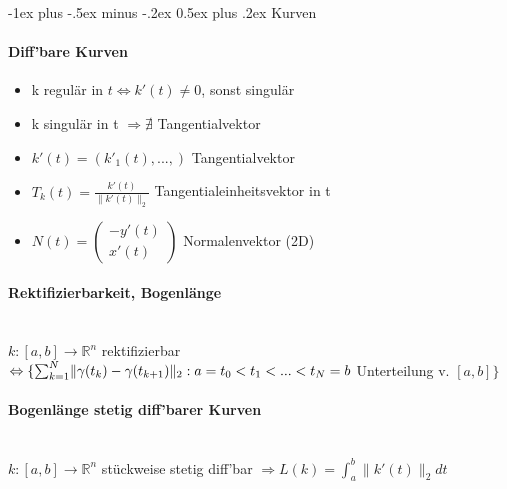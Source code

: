 \documentclass[paper=a3,paper=landscape, fontsize=9pt, DIV=30]{scrartcl}
\makeatletter
\newcommand{\real}{{\mathbb{R}}}
\renewcommand{\section}{\@startsection{section}{1}{0mm}%
  {-1ex plus -.5ex minus -.2ex}%
  {0.5ex plus .2ex}%
  {\color{blue}\normalfont\large\bfseries}}
\makeatother
\begin{document}
\begin{multicols*}{4}
  \section{Kurven}
  \paragraph{Diff'bare Kurven}
  \begin{itemize}
  \item k regulär in $t \Leftrightarrow k'(t) \neq 0$, sonst singulär
  \item k singulär in t $\Rightarrow \nexists$ Tangentialvektor
  \item $k'(t)=(k'_1(t),...,)$ Tangentialvektor
  \item $T_k(t)=\frac{k'(t)}{\lVert k'(t)\rVert_2}$ Tangentialeinheitsvektor in t
  \item $N(t)=\begin{pmatrix}
  -y'(t)\\x'(t)
  \end{pmatrix}$ Normalenvektor (2D)
  \end{itemize}


  \paragraph{Rektifizierbarkeit, Bogenlänge}\hspace{0pt} \\
  $k:[a,b]\rightarrow \real^n$ rektifizierbar $\Leftrightarrow \{\sum_{k=1}^{N}\lVert\gamma(t_k)-\gamma(t_{k+1})\rVert_2:\\
  a = t_0 < t_1 < ... < t_N = b$ Unterteilung v. $[a,b]\}$


  \paragraph{Bogenlänge stetig diff'barer Kurven}\hspace{0pt} \\
  $k: [a,b]\rightarrow \real^n$ stückweise stetig diff'bar $\Rightarrow L(k)=\int_{a}^{b}\lVert k'(t)\rVert_2 dt$


\end{multicols*}
\end{document}
